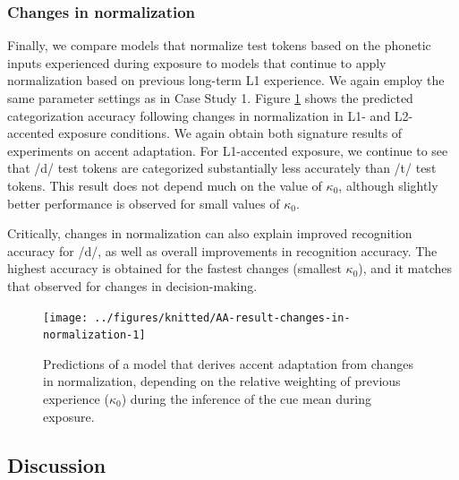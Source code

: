\documentclass[
  11pt,
  man,floatsintext]{apa6}
\begin{document}
\hypertarget{changes-in-normalization-1}{%
\subsubsection{Changes in normalization}\label{changes-in-normalization-1}}

Finally, we compare models that normalize test tokens based on the phonetic inputs experienced during exposure to models that continue to apply normalization based on previous long-term L1 experience. We again employ the same parameter settings as in Case Study 1.
Figure \ref{fig:AA-result-changes-in-normalization} shows the predicted categorization accuracy following changes in normalization in L1- and L2-accented exposure conditions. We again obtain both signature results of experiments on accent adaptation. For L1-accented exposure, we continue to see that /d/ test tokens are categorized substantially less accurately than /t/ test tokens. This result does not depend much on the value of \(\kappa_0\), although slightly better performance is observed for small values of \(\kappa_0\).

Critically, changes in normalization can also explain improved recognition accuracy for /d/, as well as overall improvements in recognition accuracy. The highest accuracy is obtained for the fastest changes (smallest \(\kappa_0\)), and it matches that observed for changes in decision-making.



\begin{figure}

{\centering \texttt{[image: ../figures/knitted/AA-result-changes-in-normalization-1]} 

}

\caption{Predictions of a model that derives accent adaptation from changes in normalization, depending on the relative weighting of previous experience (\(\kappa_0\)) during the inference of the cue mean during exposure.}\label{fig:AA-result-changes-in-normalization}
\end{figure}

\hypertarget{discussion-1}{%
\subsection{Discussion}\label{discussion-1}}
\end{document}
